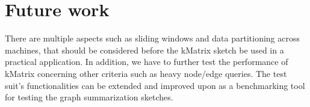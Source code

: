 \section{Future work}
\label{sec:future_work}

There are multiple aspects such as sliding windows and data partitioning across machines, that should be considered before the kMatrix sketch be used in a practical application. In addition, we have to further test the performance of kMatrix concerning other criteria such as heavy node/edge queries. The test suit’s functionalities can be extended and improved upon as a benchmarking tool for testing the graph summarization sketches. 
